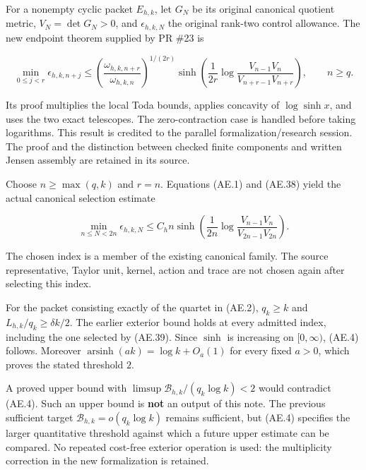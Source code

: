 For a nonempty cyclic packet \(E_{h,k}\), let \(G_N\) be its original
canonical quotient metric, \(V_N=\det G_N>0\), and \(\epsilon_{h,k,N}\)
the original rank-two control allowance. The new endpoint theorem
supplied by PR \#23 is

\[
 \min_{0\le j<r}\epsilon_{h,k,n+j}
 \le
 \left(\frac{\omega_{h,k,n+r}}{\omega_{h,k,n}}\right)^{1/(2r)}
 \sinh\!\left(\frac1{2r}
       \log\frac{V_{n-1}V_n}{V_{n+r-1}V_{n+r}}\right),\qquad n\ge q.
                                                                         \tag{AE.38}\label{AE.eq.38}
\]

Its proof multiplies the local Toda bounds, applies concavity of
\(\log\sinh x\), and uses the two exact telescopes. The zero-contraction
case is handled before taking logarithms. This result is credited to the
parallel formalization/research session. The proof and the distinction
between checked finite components and written Jensen assembly are
retained in its source.

Choose \(n\ge\max(q,k)\) and \(r=n\). Equations (AE.1) and (AE.38) yield the
actual canonical selection estimate

\[
 \boxed{
 \min_{n\le N<2n}\epsilon_{h,k,N}
 \le C_hn\sinh\!\left(\frac1{2n}
                 \log\frac{V_{n-1}V_n}{V_{2n-1}V_{2n}}\right).
 }                                                                     \tag{AE.39}\label{AE.eq.39}
\]

The chosen index is a member of the existing canonical family. The
source representative, Taylor unit, kernel, action and trace are not
chosen again after selecting this index.

For the packet consisting exactly of the quartet in (AE.2), \(q_k\ge k\)
and \(L_{h,k}/q_k\ge\delta k/2\). The earlier exterior bound holds at
every admitted index, including the one selected by (AE.39). Since
\(\sinh\) is increasing on \([0,\infty)\), (AE.4) follows. Moreover
\(\operatorname{arsinh}(ak)=\log k+O_a(1)\) for every fixed \(a>0\),
which proves the stated threshold \(2\).

A proved upper bound with \(\limsup\mathcal B_{h,k}/(q_k\log k)<2\)
would contradict (AE.4). Such an upper bound is \textbf{not} an output of
this note. The previous sufficient target
\(\mathcal B_{h,k}=o(q_k\log k)\) remains sufficient, but (AE.4) specifies
the larger quantitative threshold against which a future upper estimate
can be compared. No repeated cost-free exterior operation is used: the
multiplicity correction in the new formalization is retained.

